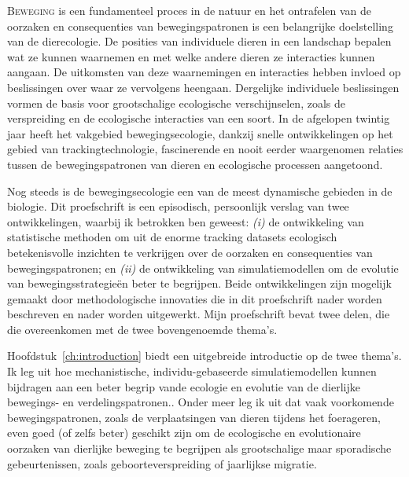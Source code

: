 
\label{ch:dutchabstract}

\lettrine{B}{eweging} is een fundamenteel proces in de natuur en het ontrafelen van de oorzaken en consequenties van bewegingspatronen is een belangrijke doelstelling van de dierecologie. De posities van individuele dieren in een landschap bepalen wat ze kunnen waarnemen en met welke andere dieren ze interacties kunnen aangaan. De uitkomsten van deze waarnemingen en interacties hebben invloed op beslissingen over waar ze vervolgens heengaan. Dergelijke individuele beslissingen vormen de basis voor grootschalige ecologische verschijnselen, zoals de verspreiding en de ecologische interacties van een soort. In de afgelopen twintig jaar heeft het vakgebied bewegingsecologie, dankzij snelle ontwikkelingen op het gebied van trackingtechnologie, fascinerende en nooit eerder waargenomen relaties tussen de bewegingspatronen van dieren en ecologische processen aangetoond.

Nog steeds is de bewegingsecologie een van de meest dynamische gebieden in de biologie. Dit proefschrift is een episodisch, persoonlijk verslag van twee ontwikkelingen, waarbij ik betrokken ben geweest: \textit{(i)} de ontwikkeling van statistische methoden om uit de enorme tracking datasets ecologisch betekenisvolle inzichten te verkrijgen over de oorzaken en consequenties van bewegingspatronen; en \textit{(ii)} de ontwikkeling van simulatiemodellen om de evolutie van bewegingsstrategie{\"e}n beter te begrijpen. Beide ontwikkelingen zijn mogelijk gemaakt door methodologische innovaties die in dit proefschrift nader worden beschreven en nader worden uitgewerkt. Mijn proefschrift bevat twee delen, die die overeenkomen met de twee bovengenoemde thema's.

Hoofdstuk~\ref{ch:introduction} biedt een uitgebreide introductie op de twee thema's. Ik leg uit hoe mechanistische, individu-gebaseerde simulatiemodellen kunnen bijdragen aan een beter begrip vande ecologie en evolutie van de dierlijke bewegings- en verdelingspatronen.. Onder meer leg ik uit dat vaak voorkomende bewegingspatronen, zoals de verplaatsingen van dieren tijdens het foerageren, even goed (of zelfs beter) geschikt zijn om de ecologische en evolutionaire oorzaken van dierlijke beweging te begrijpen als grootschalige maar sporadische gebeurtenissen, zoals geboorteverspreiding of jaarlijkse migratie.

